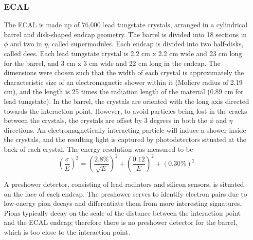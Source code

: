 \subsubsection{ECAL}
\label{exp:ECAL}
The ECAL is made up of 
76,000 lead tungstate crystals,
arranged in a cylindrical barrel and disk-shaped endcap geometry.  
The barrel is divided into 18 sections in $\phi$ and 
two in $\eta$, called supermodules.  
Each endcap is divided into two half-disks, called dees.  
Each lead tungstate crystal is 
2.2 cm x 2.2 cm wide and 23 cm long for the barrel, 
and 3 cm x 3 cm wide and 22 cm long in the endcap.  
The dimensions were chosen such that the width 
of each crystal is approximately the characteristic size of 
an electromagnetic shower within it 
(Moliere radius of 2.19 cm),
and the length is 
25 times the radiation length 
of the material (0.89 cm for lead tungstate).  
In the barrel, the crystals are oriented with the long axis
directed towards the interaction point.  
However, to avoid particles being lost in the cracks 
between the crystals,
the crystals are offset by 3 degrees in both the 
$\phi$ and $\eta$ directions.  
An electromagnetically-interacting particle will 
induce a shower inside the crystals, 
and the resulting light is captured by 
photodetectors situated at the back of each crystal.  
The energy resolution was measured to be 
\[
\left(\frac{\sigma}{E}\right)^2 = \left(\frac{2.8\%}{\sqrt{E}}\right)^2 + \left(\frac{0.12}{E}\right)^2 + \left(0.30\%\right)^2
\]

A preshower detector, consisting of lead radiators 
and silicon sensors, 
is situated on the face of each endcap.  
The preshower serves to identify electron pairs due to low-energy 
pion decays and differentiate them from more 
interesting signatures.  
Pions typically decay on the scale 
of the distance between the interaction point and the 
ECAL endcap;
therefore there is no preshower detector for the barrel, 
which is too close to the interaction point.  

